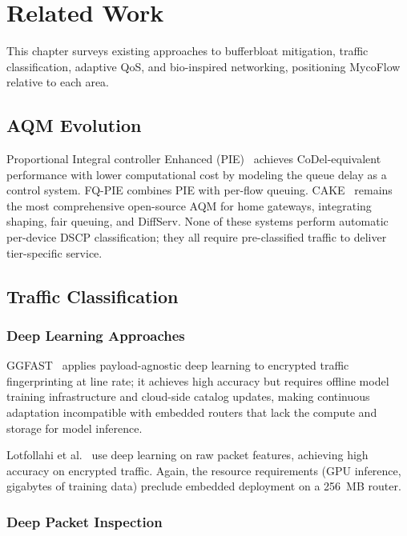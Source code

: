 
\chapter{Related Work}\label{chapter:related}

This chapter surveys existing approaches to bufferbloat mitigation, traffic classification, adaptive QoS, and bio-inspired networking, positioning MycoFlow relative to each area.

\section{AQM Evolution}

Proportional Integral controller Enhanced (PIE)~\cite{pan2013pie} achieves CoDel-equivalent performance with lower computational cost by modeling the queue delay as a control system. FQ-PIE combines PIE with per-flow queuing. CAKE~\cite{cake2018} remains the most comprehensive open-source AQM for home gateways, integrating shaping, fair queuing, and DiffServ. None of these systems perform automatic per-device DSCP classification; they all require pre-classified traffic to deliver tier-specific service.

\section{Traffic Classification}

\subsection{Deep Learning Approaches}

GGFAST~\cite{ggfast2023} applies payload-agnostic deep learning to encrypted traffic fingerprinting at line rate; it achieves high accuracy but requires offline model training infrastructure and cloud-side catalog updates, making continuous adaptation incompatible with embedded routers that lack the compute and storage for model inference.

Lotfollahi et al.~\cite{lotfollahi2020deep} use deep learning on raw packet features, achieving high accuracy on encrypted traffic. Again, the resource requirements (GPU inference, gigabytes of training data) preclude embedded deployment on a 256~MB router.

\subsection{Deep Packet Inspection}

